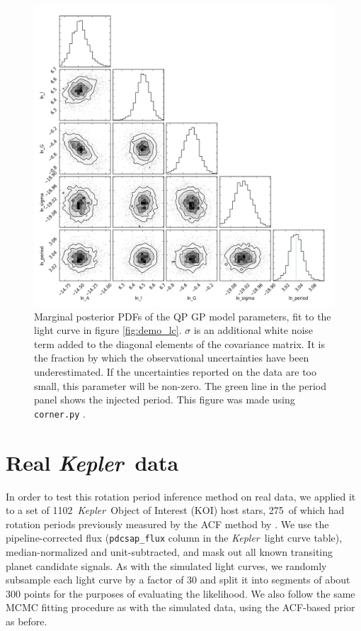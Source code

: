 \documentclass[useAMS, usenatbib, preprint, 12pt]{aastex}
\newcommand{\nkois}{1102}
\newcommand{\nkoimcq}{275}
\newcommand{\Kepler}{{\it Kepler}}
\newcommand{\kepler}{\Kepler}
\begin{document}
\begin{figure}
\begin{center}
\includegraphics[width=6in, clip=true]{figures/25.png}
\caption{Marginal posterior PDFs of the QP GP model parameters, fit to the
    light curve in figure \ref{fig:demo_lc}.
$\sigma$ is an
additional white noise term added to the diagonal elements of the covariance
matrix. It is the fraction by which the observational uncertainties have been
underestimated. If the uncertainties reported on the data are too small, this
parameter will be non-zero.
    The green line in the period panel shows the injected period.
    This figure was made using \texttt{corner.py} \citep{Corner}.}
\label{fig:gp_posteriors}
\end{center}
\end{figure}

\section{Real \kepler\ data}
\label{sec:kepler}

In order to test this rotation period inference method on real data,
we applied it to a set of \nkois\ \Kepler\ Object of Interest (KOI)
host stars, \nkoimcq\ of which had rotation periods previously measured by
the ACF method by \citet{Mcquillan2013}.  We use the pipeline-corrected flux
(\texttt{pdcsap\_flux} column in the \Kepler\ light curve table), median-normalized
and unit-subtracted, and mask out all known transiting planet candidate signals.
As with the simulated light curves, we randomly subsample each
light curve by a factor of 30 and split it into segments of about 300 points
for the purposes of evaluating the likelihood.  We also follow the same MCMC
fitting procedure as with the simulated data, using the ACF-based prior as before.
\end{document}
